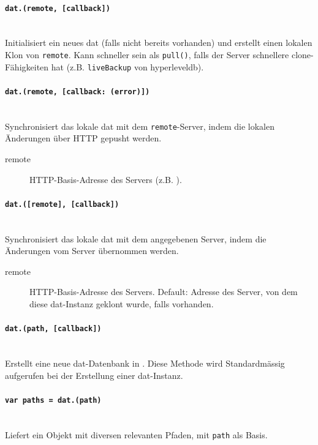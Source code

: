 
\paragraph{\texttt{dat.(remote, [callback])}} ~\\
Initialisiert ein neues dat (falls nicht bereits vorhanden) und erstellt einen lokalen Klon von \texttt{remote}. Kann schneller sein als \texttt{pull()}, falls der Server schnellere clone-Fähigkeiten hat (z.B. \texttt{liveBackup} von hyperleveldb).


\paragraph{\texttt{dat.(remote, [callback: (error)])}} ~\\
Synchronisiert das lokale dat mit dem \texttt{remote}-Server, indem die lokalen Änderungen über HTTP gepusht werden.

\begin{description}
\item[remote] HTTP-Basis-Adresse des Servers (z.B. ).
\end{description}

\paragraph{\texttt{dat.([remote], [callback])}} ~\\
Synchronisiert das lokale dat mit dem angegebenen Server, indem die Änderungen vom Server übernommen werden.

\begin{description}
\item[remote] HTTP-Basis-Adresse des Servers. Default: Adresse des Server, von dem diese dat-Instanz geklont wurde, falls vorhanden.
\end{description}

\paragraph{\texttt{dat.(path, [callback])}} ~\\
Erstellt eine neue dat-Datenbank in . Diese Methode wird Standardmässig aufgerufen bei der Erstellung einer dat-Instanz.

\paragraph{\texttt{var paths = dat.(path)}} ~\\
Liefert ein Objekt mit diversen relevanten Pfaden, mit \texttt{path} als Basis.

